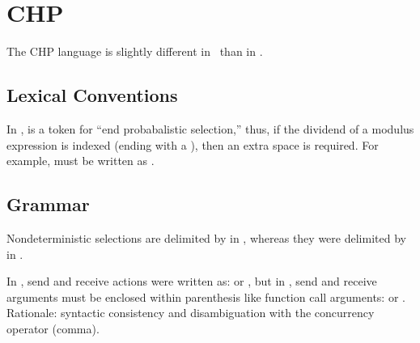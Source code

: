 
\section{CHP}
\label{sec:chp}

The CHP language is slightly different in \hac\ than in \CAST.  

\subsection{Lexical Conventions}
\label{sec:chp:lex}

In \hac, \ttt{\chpendprobsel} is a token for ``end probabalistic selection,''
thus, if the dividend of a modulus expression is indexed
(ending with a \rbracket), then an extra space is required.
For example,  must be written as
.

\subsection{Grammar}
\label{sec:chp:grammar}

Nondeterministic selections are delimited by \ttt{:} in \hac, 
whereas they were delimited by \ttt{|} in \CAST.  


In \CAST, send and receive actions were written as:
 or , but in \hac, send and receive arguments must be
enclosed within parenthesis like function call arguments:
 or .  
Rationale: syntactic consistency and disambiguation with the 
concurrency operator (comma).  




